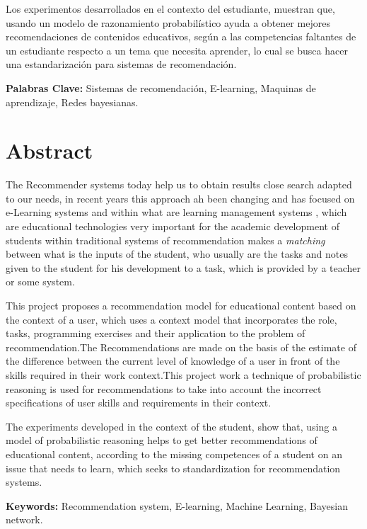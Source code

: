 Los experimentos desarrollados en el contexto del estudiante, muestran que, usando un modelo de razonamiento probabilístico ayuda a obtener mejores recomendaciones de contenidos educativos, según a las competencias faltantes de un estudiante respecto a un tema que necesita aprender, lo cual se busca hacer una estandarización para sistemas de recomendación.




\singlespacing
\vspace*{0.5cm} \noindent \textbf{Palabras Clave:} Sistemas de recomendación, E-learning, Maquinas de aprendizaje, Redes bayesianas.




\chapter*{Abstract}

The Recommender systems today help us to obtain results close search adapted to our needs, in recent years this approach ah been changing and has focused on e-Learning systems and within what are learning management  systems , which are educational technologies very important for the academic development of students  within traditional systems of recommendation makes a \emph {matching} between what is the inputs of the student, who usually are the tasks and notes given to the student for his development to a task, which is provided by a teacher or some system.

This project proposes a recommendation model for educational content  based on the context of a user, which uses a context model that incorporates the role, tasks, programming exercises and their application to the problem of recommendation.The  Recommendations are made on the basis of the estimate of the difference between the current level of knowledge of a user in front of the skills required in their work context.This project work a technique of probabilistic reasoning is used for recommendations to take into account the incorrect specifications of user skills and requirements in their  context.

The experiments developed in the context of the student, show that, using a model of probabilistic reasoning helps to get better recommendations of educational content, according to the missing competences of a student on an issue that needs to learn, which seeks to standardization for recommendation systems.

\singlespacing
\vspace*{0.5cm} \noindent \textbf{Keywords:} Recommendation system, E-learning, Machine Learning, Bayesian network.

